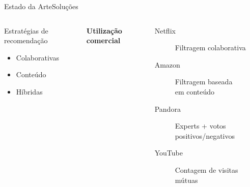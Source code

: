 \begin{frame}{Estado da Arte}{Soluções}
\begin{columns}[c]
\begin{block}{Estratégias de recomendação}
\begin{itemize}
	\item Colaborativas
	\item Conteúdo
	\item Híbridas
\end{itemize}
\end{block}





\textbf{Utilização comercial} \\ \cite{chiang2012networked}

\begin{description}
\item[Netflix] Filtragem colaborativa
\item[Amazon] Filtragem baseada \\ em conteúdo
\item[Pandora] Experts + votos positivos/negativos
\item[YouTube] Contagem de visitas mútuas
\end{description}
\end{columns}
\end{frame}


